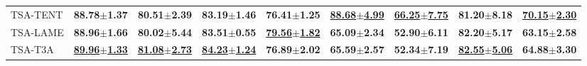 \begin{table*}[t]
\begin{center}
{\begin{tabular}{lcccccccc}
\\
\midrule
TSA-TENT  & \textbf{88.78$\pm$1.37} & \textbf{80.51$\pm$2.39} & \textbf{83.19$\pm$1.46} & \textbf{76.41$\pm$1.25} & \underline{\textbf{88.68$\pm$4.99}} & \underline{\textbf{66.25$\pm$7.75}} & \textbf{81.20$\pm$8.18} & \underline{\textbf{70.15$\pm$2.30}} 
\\
TSA-LAME & \textbf{88.96$\pm$1.66} & \textbf{80.02$\pm$5.44} & \textbf{83.51$\pm$0.55} & \underline{\textbf{79.56$\pm$1.82}} & \textbf{65.09$\pm$2.34} & \textbf{52.90$\pm$6.11} & \textbf{82.20$\pm$5.17} & \textbf{63.15$\pm$2.58}
\\
TSA-T3A  & \underline{\textbf{89.96$\pm$1.33}} & \underline{\textbf{81.08$\pm$2.73}} & \underline{\textbf{84.23$\pm$1.24}} & \textbf{76.89$\pm$2.02} & \textbf{65.59$\pm$2.57} & \textbf{52.34$\pm$7.19} & \underline{\textbf{82.55$\pm$5.06}} & \textbf{64.88$\pm$3.30} 
\\
\bottomrule
\end{tabular}
}
\end{center}
\vspace{-3mm}
\end{table*}










